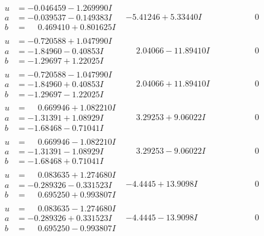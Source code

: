 \documentclass[1p]{elsarticle_modified}
\theoremstyle{definition}
\begin{document}
$$\begin{array}{c|c|c}
\begin{aligned}
u &= -0.046459 - 1.269990 I \\
a &= -0.039537 - 0.149383 I \\
b &= \phantom{-}0.469410 + 0.801625 I\end{aligned}
 & -5.41246 + 5.33440 I & \phantom{-0.000000 } 0 \\ \hline\begin{aligned}
u &= -0.720588 + 1.047990 I \\
a &= -1.84960 - 0.40853 I \\
b &= -1.29697 + 1.22025 I\end{aligned}
 & \phantom{-}2.04066 - 11.89410 I & \phantom{-0.000000 } 0 \\ \hline\begin{aligned}
u &= -0.720588 - 1.047990 I \\
a &= -1.84960 + 0.40853 I \\
b &= -1.29697 - 1.22025 I\end{aligned}
 & \phantom{-}2.04066 + 11.89410 I & \phantom{-0.000000 } 0 \\ \hline\begin{aligned}
u &= \phantom{-}0.669946 + 1.082210 I \\
a &= -1.31391 + 1.08929 I \\
b &= -1.68468 - 0.71041 I\end{aligned}
 & \phantom{-}3.29253 + 9.06022 I & \phantom{-0.000000 } 0 \\ \hline\begin{aligned}
u &= \phantom{-}0.669946 - 1.082210 I \\
a &= -1.31391 - 1.08929 I \\
b &= -1.68468 + 0.71041 I\end{aligned}
 & \phantom{-}3.29253 - 9.06022 I & \phantom{-0.000000 } 0 \\ \hline\begin{aligned}
u &= \phantom{-}0.083635 + 1.274680 I \\
a &= -0.289326 - 0.331523 I \\
b &= \phantom{-}0.695250 + 0.993807 I\end{aligned}
 & -4.4445 + 13.9098 I & \phantom{-0.000000 } 0 \\ \hline\begin{aligned}
u &= \phantom{-}0.083635 - 1.274680 I \\
a &= -0.289326 + 0.331523 I \\
b &= \phantom{-}0.695250 - 0.993807 I\end{aligned}
 & -4.4445 - 13.9098 I & \phantom{-0.000000 } 0 \\ \hline\begin{aligned}

\end{aligned}
\end{array}$$
\end{document}
